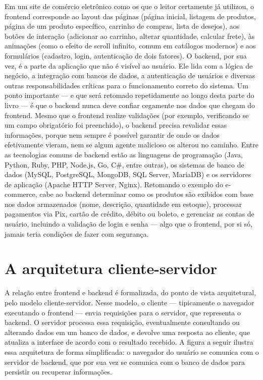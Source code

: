 Em um site de comércio eletrônico como os que o leitor certamente já utilizou, o frontend corresponde ao layout das páginas (página inicial, listagem de produtos, página de um produto específico, carrinho de compras, lista de desejos), aos botões de interação (adicionar ao carrinho, alterar quantidade, calcular frete), às animações (como o efeito de scroll infinito, comum em catálogos modernos) e aos formulários (cadastro, login, autenticação de dois fatores). O backend, por sua vez, é a parte da aplicação que não é visível ao usuário. Ele lida com a lógica de negócio, a integração com bancos de dados, a autenticação de usuários e diversas outras responsabilidades críticas para o funcionamento correto do sistema. Um ponto importante — e que será retomado repetidamente ao longo desta parte do livro — é que o backend nunca deve confiar cegamente nos dados que chegam do frontend. Mesmo que o frontend realize validações (por exemplo, verificando se um campo obrigatório foi preenchido), o backend precisa revalidar essas informações, porque nem sempre é possível garantir de onde os dados efetivamente vieram, nem se algum agente malicioso os alterou no caminho. Entre as tecnologias comuns de backend estão as linguagens de programação (Java, Python, Ruby, PHP, Node.js, Go, C\#, entre outras), os sistemas de banco de dados (MySQL, PostgreSQL, MongoDB, SQL Server, MariaDB) e os servidores de aplicação (Apache HTTP Server, Nginx). Retomando o exemplo do e-commerce, cabe ao backend determinar como os produtos são exibidos com base nos dados armazenados (nome, descrição, quantidade em estoque), processar pagamentos via Pix, cartão de crédito, débito ou boleto, e gerenciar as contas de usuário, incluindo a validação de login e senha — algo que o frontend, por si só, jamais teria condições de fazer com segurança.

\section{A arquitetura cliente-servidor}

A relação entre frontend e backend é formalizada, do ponto de vista arquitetural, pelo modelo cliente-servidor. Nesse modelo, o cliente — tipicamente o navegador executando o frontend — envia requisições para o servidor, que representa o backend. O servidor processa essa requisição, eventualmente consultando ou alterando dados em um banco de dados, e devolve uma resposta ao cliente, que atualiza a interface de acordo com o resultado recebido. A figura a seguir ilustra essa arquitetura de forma simplificada: o navegador do usuário se comunica com o servidor de backend, que por sua vez se comunica com o banco de dados para persistir ou recuperar informações.

